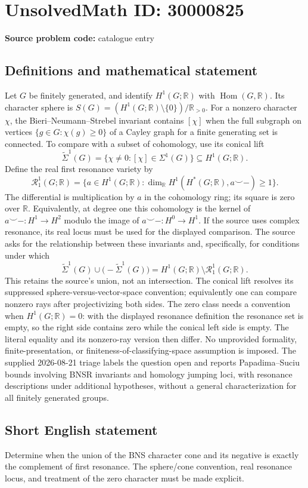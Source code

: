 \documentclass[11pt]{article}
\newcommand{\R}{\mathbb{R}}
\begin{document}
\section*{UnsolvedMath ID: 30000825}
\textbf{Source problem code:} catalogue entry
\subsection{Definitions and mathematical statement}
Let $G$ be finitely generated, and identify $H^1(G;\R)$ with $\operatorname{Hom}(G,\R)$. Its character sphere is $S(G)=(H^1(G;\R)\setminus\{0\})/\R_{>0}$. For a nonzero character $\chi$, the Bieri--Neumann--Strebel invariant contains $[\chi]$ when the full subgraph on vertices $\{g\in G:\chi(g)\geq0\}$ of a Cayley graph for a finite generating set is connected. To compare with a subset of cohomology, use its conical lift \[\widetilde\Sigma^1(G)=\{\chi\ne0:[\chi]\in\Sigma^1(G)\}\subseteq H^1(G;\R).\] Define the real first resonance variety by \[\mathcal R_1^1(G;\R)=\{a\in H^1(G;\R):\dim_\R H^1(H^*(G;\R),a\smile-)\geq1\}.\] The differential is multiplication by $a$ in the cohomology ring; its square is zero over $\R$. Equivalently, at degree one this cohomology is the kernel of $a\smile-:H^1\to H^2$ modulo the image of $a\smile-:H^0\to H^1$. If the source uses complex resonance, its real locus must be used for the displayed comparison. The source asks for the relationship between these invariants and, specifically, for conditions under which \[\widetilde\Sigma^1(G)\cup\bigl(-\widetilde\Sigma^1(G)\bigr)=H^1(G;\R)\setminus\mathcal R_1^1(G;\R).\] This retains the source's union, not an intersection. The conical lift resolves its suppressed sphere-versus-vector-space convention; equivalently one can compare nonzero rays after projectivizing both sides. The zero class needs a convention when $H^1(G;\R)=0$: with the displayed resonance definition the resonance set is empty, so the right side contains zero while the conical left side is empty. The literal equality and its nonzero-ray version then differ. No unprovided formality, finite-presentation, or finiteness-of-classifying-space assumption is imposed. The supplied 2026-08-21 triage labels the question open and reports Papadima--Suciu bounds involving BNSR invariants and homology jumping loci, with resonance descriptions under additional hypotheses, without a general characterization for all finitely generated groups.
\subsection{Short English statement}
Determine when the union of the BNS character cone and its negative is exactly the complement of first resonance. The sphere/cone convention, real resonance locus, and treatment of the zero character must be made explicit.
\end{document}
